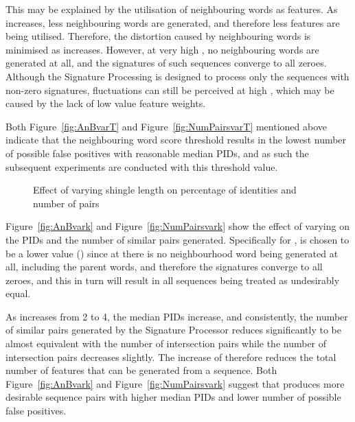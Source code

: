 \documentclass[titlepage]{csetr}
\begin{document}
This may be explained by the utilisation of neighbouring words as features. As  increases, less neighbouring words are generated, and therefore less features are being utilised. Therefore, the distortion caused by neighbouring words is minimised as  increases. However, at very high , no neighbouring words are generated at all, and the signatures of such sequences converge to all zeroes. Although the Signature Processing is designed to process only the sequences with non-zero signatures, fluctuations can still be perceived at high , which may be caused by the lack of low value feature weights.

Both Figure~\ref{fig:AnBvarT} and Figure~\ref{fig:NumPairsvarT} mentioned above indicate that the neighbouring word score threshold  results in the lowest number of possible false positives with reasonable median PIDs, and as such the subsequent experiments are conducted with this threshold value.

\begin{figure}[t]
\centering
{}
\caption{Effect of varying shingle length on percentage of identities and number of pairs}
\label{fig:exp-quality-varK}
\end{figure}

Figure~\ref{fig:AnBvark} and Figure~\ref{fig:NumPairsvark} show the effect of varying  on the PIDs and the number of similar pairs generated. Specifically for ,  is chosen to be a lower value () since at  there is no neighbourhood word being generated at all, including the parent words, and therefore the signatures converge to all zeroes, and this in turn will result in all sequences being treated as undesirably equal. 

As  increases from 2 to 4, the median PIDs increase, and consistently, the number of similar pairs generated by the Signature Processor reduces significantly to be almost equivalent with the number of intersection pairs while the number of intersection pairs decreases slightly. The increase of  therefore reduces the total number of features that can be generated from a sequence. Both Figure~\ref{fig:AnBvark} and Figure~\ref{fig:NumPairsvark} suggest that  produces more desirable sequence pairs with higher median PIDs and lower number of possible false positives.
\end{document}
